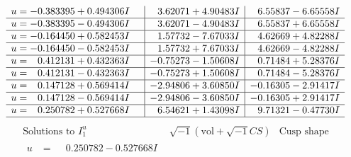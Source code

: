 \documentclass[1p]{elsarticle_modified}
\theoremstyle{definition}
\newcommand{\I}{\sqrt{-1}}
\begin{document}
$$\begin{array}{c|c|c}
\begin{aligned}
u &= -0.383395 + 0.494306 I\end{aligned}
 & \phantom{-}3.62071 + 4.90483 I & \phantom{-}6.55837 - 6.65558 I \\ \hline\begin{aligned}
u &= -0.383395 - 0.494306 I\end{aligned}
 & \phantom{-}3.62071 - 4.90483 I & \phantom{-}6.55837 + 6.65558 I \\ \hline\begin{aligned}
u &= -0.164450 + 0.582453 I\end{aligned}
 & \phantom{-}1.57732 - 7.67033 I & \phantom{-}4.62669 + 4.82288 I \\ \hline\begin{aligned}
u &= -0.164450 - 0.582453 I\end{aligned}
 & \phantom{-}1.57732 + 7.67033 I & \phantom{-}4.62669 - 4.82288 I \\ \hline\begin{aligned}
u &= \phantom{-}0.412131 + 0.432363 I\end{aligned}
 & -0.75273 - 1.50608 I & \phantom{-}0.71484 + 5.28376 I \\ \hline\begin{aligned}
u &= \phantom{-}0.412131 - 0.432363 I\end{aligned}
 & -0.75273 + 1.50608 I & \phantom{-}0.71484 - 5.28376 I \\ \hline\begin{aligned}
u &= \phantom{-}0.147128 + 0.569414 I\end{aligned}
 & -2.94806 + 3.60850 I & -0.16305 - 2.91417 I \\ \hline\begin{aligned}
u &= \phantom{-}0.147128 - 0.569414 I\end{aligned}
 & -2.94806 - 3.60850 I & -0.16305 + 2.91417 I \\ \hline\begin{aligned}
u &= \phantom{-}0.250782 + 0.527668 I\end{aligned}
 & \phantom{-}6.54621 + 1.43098 I & \phantom{-}9.71321 - 0.47730 I\\
 \hline 
 \end{array}$$\newpage$$\begin{array}{c|c|c}  
\text{Solutions to }I^u_{1}& \I (\text{vol} + \sqrt{-1}CS) & \text{Cusp shape}\\
 \hline 
\begin{aligned}
u &= \phantom{-}0.250782 - 0.527668 I\end{aligned}

\end{array}$$
\end{document}
